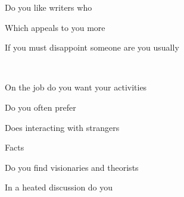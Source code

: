 \documentclass[english,pdf,pagemark,stamp,globalid=\candidateID,oneside,PrintQuestionnaireId=False]{sdaps}
\begin{document}
\begin{questionnaire}
\begin{multicols}{2}
\begin{choicequestion}[2]{Do you like writers who}
\end{choicequestion}

\begin{choicequestion}[2]{Which appeals to you more}
\end{choicequestion}

\begin{choicequestion}[2]{If you must disappoint someone are you usually}
\end{choicequestion}
\\
\begin{choicequestion}[2]{On the job do you want your activities}
\end{choicequestion}

\begin{choicequestion}[2]{Do you often prefer}
\end{choicequestion}

\begin{choicequestion}[2]{Does interacting with strangers}
\end{choicequestion}

\begin{choicequestion}[2]{Facts}
\end{choicequestion}

\begin{choicequestion}[2]{Do you find visionaries and theorists}
\end{choicequestion}

\begin{choicequestion}[2]{In a heated discussion do you}
\end{choicequestion}


\end{multicols}
\end{questionnaire}
\end{document}
